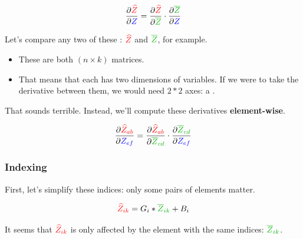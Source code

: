             \begin{equation}
                \pderiv{\red{\widehat{Z}}}{\blu{Z}} = 
                \pderiv{\red{\widehat{Z}}}{\grn{\overline{Z}}} \cdot \pderiv{\grn{\overline{Z}}}{\blu{Z}}
            \end{equation}

            Let's compare any two of these : $\textcolor{red}{\widehat{Z}}$ and $\grn{\overline{Z}}$, for example.

            \begin{itemize}
                \item These are both $(n \times k)$ matrices.
                \item That means that each has two dimensions of variables. If we were to take the derivative between them, we would need $2*2$ axes: a .
            \end{itemize}

            That sounds terrible. Instead, we'll compute these derivatives \textbf{element-wise}.

            \begin{equation}
                \pderiv{ \red{\widehat{Z}_{ab}} }{ \blu{Z_{ef}} } = 
                \pderiv{ \red{\widehat{Z}_{ab}} }{ \grn{\overline{Z}_{cd} } } \cdot 
                \pderiv{ \grn{\overline{Z}_{cd}} }{ \blu{Z_{ef}} }
            \end{equation}

            \subsecdiv

        \subsubsection{Indexing}

            First, let's simplify these indices: only some pairs of elements matter.

            \begin{equation}
                \red{\widehat{Z}_{ik}} = G_i * \grn{\overline{Z}_{ik}} + B_i
            \end{equation}

            It seems that $\textcolor{red}{\widehat{Z}_{ik}}$ is only affected by the element with the same indices: $\grn{\overline{Z}_{ik}}$.\\

